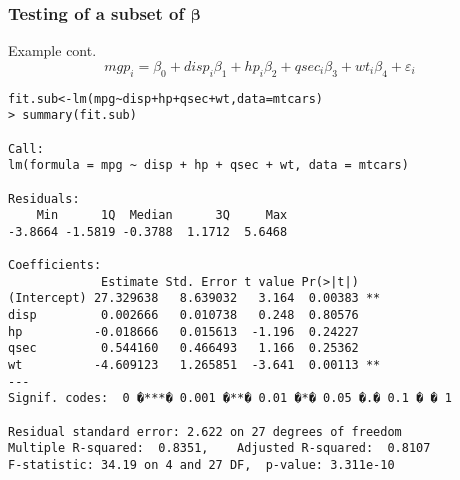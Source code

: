 \documentclass[compress]{beamer}
\begin{document}

\begin{frame}[fragile]\frametitle{Testing of a subset of $\boldsymbol{\beta}$}
Example cont.
\[mgp_i=\beta_0+disp_i\beta_1+hp_i\beta_2+qsec_i\beta_3+wt_i\beta_4+\varepsilon_i\]
\tiny\begin{verbatim}
fit.sub<-lm(mpg~disp+hp+qsec+wt,data=mtcars)
> summary(fit.sub)

Call:
lm(formula = mpg ~ disp + hp + qsec + wt, data = mtcars)

Residuals:
    Min      1Q  Median      3Q     Max 
-3.8664 -1.5819 -0.3788  1.1712  5.6468 

Coefficients:
             Estimate Std. Error t value Pr(>|t|)   
(Intercept) 27.329638   8.639032   3.164  0.00383 **
disp         0.002666   0.010738   0.248  0.80576   
hp          -0.018666   0.015613  -1.196  0.24227   
qsec         0.544160   0.466493   1.166  0.25362   
wt          -4.609123   1.265851  -3.641  0.00113 **
---
Signif. codes:  0 �***� 0.001 �**� 0.01 �*� 0.05 �.� 0.1 � � 1

Residual standard error: 2.622 on 27 degrees of freedom
Multiple R-squared:  0.8351,	Adjusted R-squared:  0.8107 
F-statistic: 34.19 on 4 and 27 DF,  p-value: 3.311e-10
\end{verbatim}
\end{frame}
\end{document}
